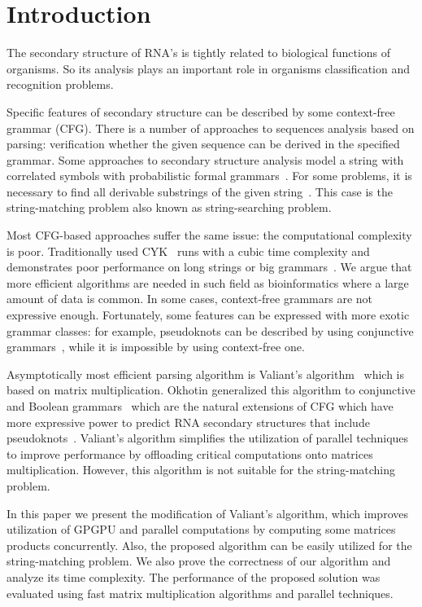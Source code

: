 \section{Introduction}

The secondary structure of RNA's is tightly related to biological functions of organisms.
So its analysis plays an important role in organisms classification and recognition problems.

Specific features of secondary structure can be described by some context-free grammar (CFG).
There is a number of approaches to sequences analysis based on parsing: verification whether the given sequence can be derived in the specified grammar.
Some approaches to secondary structure analysis model a string with correlated symbols with probabilistic formal grammars~\cite{knudsen1999rna,dowell2004evaluation}.
For some problems, it is necessary to find all derivable substrings of the given string~\cite{durbin1996biological}.
This case is the string-matching problem also known as string-searching problem.

Most CFG-based approaches suffer the same issue: the computational complexity is poor.
Traditionally used CYK~\cite{kasami1966efficient,Younger:1966:CLP:1441427.1442019} runs with a cubic time complexity and demonstrates poor performance on long strings or big grammars~\cite{liu2005parallel}.
We argue that more efficient algorithms are needed in such field as bioinformatics where a large amount of data is common.
In some cases, context-free grammars are not expressive enough.
Fortunately, some features can be expressed with more exotic grammar classes:  for example, pseudoknots can be described by using conjunctive grammars~\cite{zier2013rna}, while it is impossible by using context-free one.

Asymptotically most efficient parsing algorithm is Valiant's algorithm~\cite{Valiant:1975:GCR:1739932.1740048} which is based on matrix multiplication.
Okhotin generalized this algorithm to conjunctive and Boolean grammars~\cite{Okhotin:2014:PMM:2565359.2565379} which are the natural extensions of CFG which have more expressive power to predict RNA secondary structures that include pseudoknots~\cite{zier2013rna}.
Valiant’s algorithm simplifies the utilization of parallel techniques to improve performance by offloading critical computations onto matrices multiplication.
However, this algorithm is not suitable for the string-matching problem.

In this paper we present the modification of Valiant's algorithm, which improves utilization of GPGPU and parallel computations by computing some matrices products concurrently.
Also, the proposed algorithm can be easily utilized for the string-matching problem.
We also prove the correctness of our algorithm and analyze its time complexity.
The performance of the proposed solution was evaluated using fast matrix multiplication algorithms and parallel techniques.
